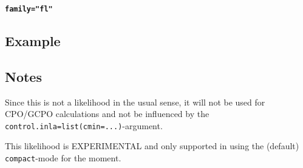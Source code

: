 \documentclass[a4paper,11pt]{article}
\begin{document}
\textbf{\texttt{family="fl"}}


\subsection*{Example}



\subsection*{Notes}

Since this is not a likelihood in the usual sense, it will not be used
for CPO/GCPO calculations and not be influenced by the
\texttt{control.inla=list(cmin=...)}-argument.

This likelihood is EXPERIMENTAL and only supported in using the
(default) \texttt{compact}-mode for the moment.
\end{document}
